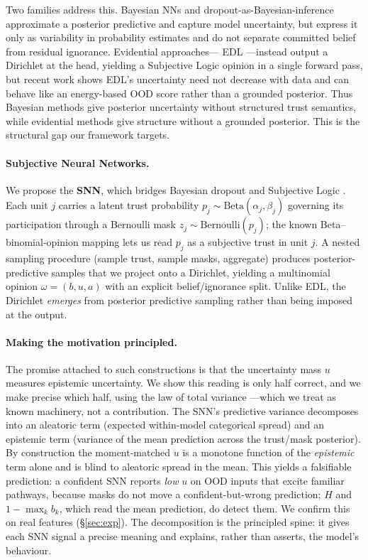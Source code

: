 \documentclass[11pt]{article}
\begin{document}
Two families address this. Bayesian NNs \citep{neal1996,blundell2015} and
dropout-as-Bayesian-inference \citep{gal2016b} approximate a posterior predictive and
capture model uncertainty, but express it only as variability in probability estimates
and do not separate committed belief from residual ignorance. Evidential approaches---
EDL \citep{sensoy2018}---instead output a Dirichlet at the head, yielding a Subjective
Logic opinion in a single forward pass, but recent work \citep{shen2024} shows EDL's
uncertainty need not decrease with data and can behave like an energy-based OOD score
rather than a grounded posterior. Thus Bayesian methods give posterior uncertainty
without structured trust semantics, while evidential methods give structure without a
grounded posterior. This is the structural gap our framework targets.

\paragraph{Subjective Neural Networks.}
We propose the \textbf{SNN}, which bridges Bayesian dropout and Subjective Logic
\citep[SL;][]{josang2016}. Each unit $j$ carries a latent trust probability
$p_j\sim\mathrm{Beta}(\alpha_j,\beta_j)$ governing its participation through a Bernoulli
mask $z_j\sim\mathrm{Bernoulli}(p_j)$; the known Beta--binomial-opinion mapping lets us
read $p_j$ as a subjective trust in unit $j$. A nested sampling procedure (sample trust,
sample masks, aggregate) produces posterior-predictive samples that we project onto a
Dirichlet, yielding a multinomial opinion $\omega=(b,u,a)$ with an explicit
belief/ignorance split. Unlike EDL, the Dirichlet \emph{emerges} from posterior
predictive sampling rather than being imposed at the output.

\paragraph{Making the motivation principled.}
The promise attached to such constructions is that the uncertainty mass $u$ measures
epistemic uncertainty. We show this reading is only half correct, and we make precise
which half, using the law of total variance \citep{kwon2020,depeweg2018}---which we
treat as known machinery, not a contribution. The SNN's predictive variance decomposes
into an aleatoric term (expected within-model categorical spread) and an epistemic term
(variance of the mean prediction across the trust/mask posterior). By construction the
moment-matched $u$ is a monotone function of the \emph{epistemic} term alone and is
blind to aleatoric spread in the mean. This yields a falsifiable prediction: a
confident SNN reports \emph{low} $u$ on OOD inputs that excite familiar pathways,
because masks do not move a confident-but-wrong prediction; $H$ and $1-\max_k b_k$,
which read the mean prediction, do detect them. We confirm this on real features
(\S\ref{sec:exp}). The decomposition is the principled spine: it gives each SNN signal a
precise meaning and explains, rather than asserts, the model's behaviour.
\end{document}

